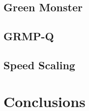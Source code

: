 \documentclass{sig-alternate}
\begin{document}
\subsection{Green Monster}
\label{sec:GM}
\subsection{GRMP-Q}
\label{sec:GRMP-Q}
\subsection{Speed Scaling}
\label{sec:SS}

\section{Conclusions} 
\label{sec:conclusion}





\pagebreak



\end{document}
